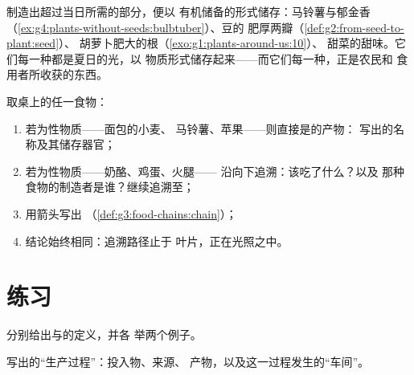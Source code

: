 \begin{example}[植物自己的储藏室]\label{ex:g6:plants-are-producers:pantry}
制造出超过当日所需的部分，便以
有机储备的形式储存：马铃薯与郁金香
（\cref{ex:g4:plants-without-seeds:bulbtuber}）、豆的
肥厚两瓣（\cref{def:g2:from-seed-to-plant:seed}）、
胡萝卜肥大的根（\cref{exo:g1:plants-around-us:10}）、
甜菜的甜味。它们每一种都是夏日的光，以
物质形式储存起来——而它们每一种，正是农民和
食用者所收获的东西。
\end{example}

\begin{method}[追溯任一食物至其叶片]\label{met:g6:plants-are-producers:trace}
取桌上的任一食物：
\begin{enumerate}
  \item 若为性物质——面包的小麦、
        马铃薯、苹果——则直接是的产物：
        写出的名称及其储存器官；
  \item 若为性物质——奶酪、鸡蛋、火腿——
        沿向下追溯：该吃了什么？以及
        那种食物的制造者是谁？继续追溯至；
  \item 用箭头写出
        （\cref{def:g3:food-chains:chain}）；
  \item 结论始终相同：追溯路径止于
        叶片，正在光照之中。
\end{enumerate}
\end{method}

\section{练习}

\begin{exercise}[$\star$]\label{exo:g6:plants-are-producers:1}
分别给出与的定义，并各
举两个例子。
\end{exercise}

\begin{exercise}[$\star$]\label{exo:g6:plants-are-producers:2}
写出的“生产过程”：投入物、来源、
产物，以及这一过程发生的“车间”。
\end{exercise}

